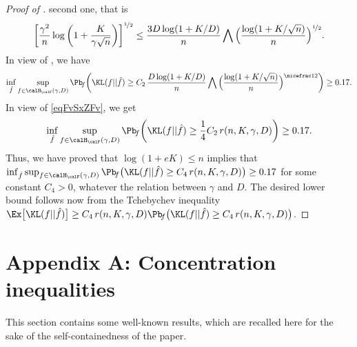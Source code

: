 \begin{proof}[Proof of ]
second one, that is
\begin{equation}\label{eqFvSxZFv}
\bigg[\frac{\gamma^2}{n} \log\bigg(1+\frac{K}{\gamma\sqrt{n}}\bigg)\bigg]^{\nicefrac12}
\le \frac{ 3 D\log(1+K/D)}{n}\bigwedge 
\Big(\frac{\log(1+K/\sqrt{n})}{n}\Big)^{\nicefrac12}.
\end{equation}
In view of , we have
\begin{equation}
\inf_{\hat f}\sup_{f \in \calH_\calF(\gamma,D)}\Pb\!_{f}\bigg(\KL(f||\hat f)\geq
C_2\,\frac{ D\log(1+K/D)}{n}\bigwedge 
\Big(\frac{\log(1+K/\sqrt{n})}{n}\Big)^{\nicefrac12}\bigg)\geq 0.17.
\end{equation}
In view of \eqref{eqFvSxZFv}, we get
\begin{equation}\label{eqFvSxZSx}
\inf_{\hat f}\sup_{f \in \calH_\calF(\gamma,D)}\Pb\!_{f}\bigg(\KL(f||\hat f)\geq
\frac14 C_2\,r(n,K,\gamma,D)\bigg)\geq 0.17.
\end{equation}
Thus, we have proved that $\log(1+eK)\le n$ implies that
$\inf_{\hat f}\sup_{f \in \calH_\calF(\gamma,D)}\Pb\!_{f}\big(\KL(f||\hat f)\geq
C_4\,r(n,K,\gamma,D)\big)\geq 0.17$ for some constant $C_4>0$, whatever the relation
between $\gamma$ and $D$. The desired lower bound follows now from the Tchebychev 
inequality
$\Ex\big[\KL(f||\hat f)\big]\ge C_4\,r(n,K,\gamma,D)
\Pb\!_{f}\big(\KL(f||\hat f)\geq C_4\,r(n,K,\gamma,D)\big)$.
\end{proof}


\section*{Appendix A: Concentration inequalities} %
\label{sec:appendix_a}

This section contains some well-known results, which are recalled here for the sake of the self-containedness
of the paper.

